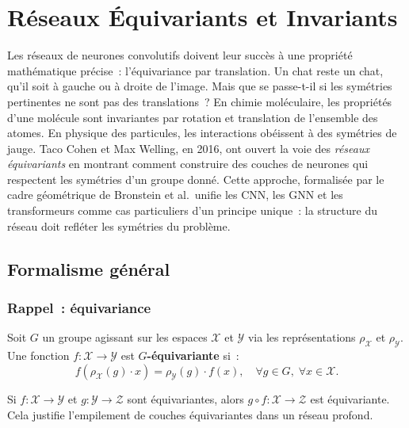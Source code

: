 \chapter{R\'eseaux \'Equivariants et Invariants}
\label{ch:equivariants}

Les r\'eseaux de neurones convolutifs doivent leur succ\`es \`a une propri\'et\'e math\'ematique pr\'ecise~: l'\'equivariance par translation. Un chat reste un chat, qu'il soit \`a gauche ou \`a droite de l'image. Mais que se passe-t-il si les sym\'etries pertinentes ne sont pas des translations~? En chimie mol\'eculaire, les propri\'et\'es d'une mol\'ecule sont invariantes par rotation et translation de l'ensemble des atomes. En physique des particules, les interactions ob\'eissent \`a des sym\'etries de jauge. Taco Cohen et Max Welling, en 2016, ont ouvert la voie des \emph{r\'eseaux \'equivariants} en montrant comment construire des couches de neurones qui respectent les sym\'etries d'un groupe donn\'e. Cette approche, formalis\'ee par le cadre g\'eom\'etrique de Bronstein et al.\, unifie les CNN, les GNN et les transformeurs comme cas particuliers d'un principe unique~: la structure du r\'eseau doit refl\'eter les sym\'etries du probl\`eme.

\section{Formalisme g\'en\'eral}

\subsection{Rappel~: \'equivariance}

\begin{definition}
Soit $G$ un groupe agissant sur les espaces $\mathcal{X}$ et $\mathcal{Y}$
via les repr\'esentations $\rho_{\mathcal{X}}$ et $\rho_{\mathcal{Y}}$.
Une fonction $f: \mathcal{X} \to \mathcal{Y}$ est \textbf{$G$-\'equivariante} si~:
\[
    f(\rho_{\mathcal{X}}(g) \cdot x) = \rho_{\mathcal{Y}}(g) \cdot f(x),
    \quad \forall g \in G,\; \forall x \in \mathcal{X}.
\]
\end{definition}

\begin{proposition}
Si $f: \mathcal{X} \to \mathcal{Y}$ et $g: \mathcal{Y} \to \mathcal{Z}$ sont
\'equivariantes, alors $g \circ f: \mathcal{X} \to \mathcal{Z}$ est \'equivariante.
Cela justifie l'empilement de couches \'equivariantes dans un r\'eseau profond.
\end{proposition}

